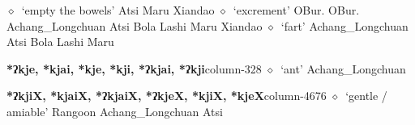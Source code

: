 \hspace{1ex}
         $\diamond$~`empty the bowels'
         Atsi 
\hspace{1ex}
         Maru 
\hspace{1ex}
         Xiandao 
\hspace{1ex}
         $\diamond$~`excrement'
         OBur. 
\hspace{1ex}
         OBur. 
\hspace{1ex}
         Achang\_Longchuan 
\hspace{1ex}
         Atsi 
\hspace{1ex}
         Bola 
\hspace{1ex}
         Lashi 
\hspace{1ex}
         Maru 
\hspace{1ex}
         Xiandao 
\hspace{1ex}
         $\diamond$~`fart'
         Achang\_Longchuan 
\hspace{1ex}
         Atsi 
\hspace{1ex}
         Bola 
\hspace{1ex}
         Lashi 
\hspace{1ex}
         Maru 
  \item {\footnotesize \textbf{*ʔkje, *kjai, *kje, *kji, *ʔkjai, *ʔkji}}{\tiny column-328}
         $\diamond$~`ant'
         Achang\_Longchuan 
  \item {\footnotesize \textbf{*ʔkjiX, *kjaiX, *ʔkjaiX, *ʔkjeX, *kjiX, *kjeX}}{\tiny column-4676}
         $\diamond$~`gentle / amiable'
         Rangoon 
\hspace{1ex}
         Achang\_Longchuan 
\hspace{1ex}
         Atsi 
